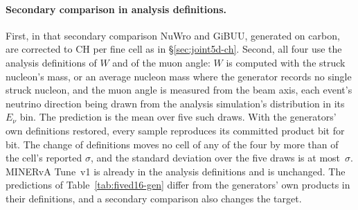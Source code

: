 \paragraph{Secondary comparison in analysis definitions.} First, in that secondary comparison NuWro and GiBUU, generated on carbon, are corrected to CH per fine cell as in \S\ref{sec:joint5d-ch}. Second, all four use the analysis definitions of $W$ and of the muon angle: $W$ is computed with the struck nucleon's mass, or an average nucleon mass where the generator records no single struck nucleon, and the muon angle is measured from the beam axis, each event's neutrino direction being drawn from the analysis simulation's distribution in its $E_\nu$ bin. The prediction is the mean over five such draws. With the generators' own definitions restored, every sample reproduces its committed product bit for bit. The change of definitions moves no cell of any of the four by more than  of the cell's reported $\sigma$, and the standard deviation over the five draws is at most \,$\sigma$. MINERvA Tune~v1 is already in the analysis definitions and is unchanged. The predictions of Table~\ref{tab:fived16-gen} differ from the generators' own products in their definitions, and a secondary comparison also changes the target.
